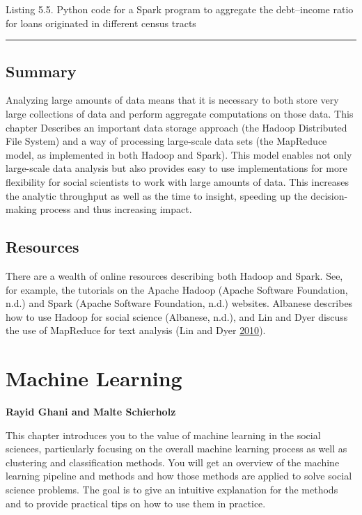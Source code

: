 \documentclass[]{krantz}
\begin{document}
Listing 5.5. Python code for a Spark program to aggregate the
debt--income ratio for loans originated in different census tracts

\begin{center}\rule{0.5\linewidth}{\linethickness}\end{center}

\section{Summary}\label{summary-2}

Analyzing large amounts of data means that it is necessary to both store
very large collections of data and perform aggregate computations on
those data. This chapter Describes an important data storage approach
(the Hadoop Distributed File System) and a way of processing large-scale
data sets (the MapReduce model, as implemented in both Hadoop and
Spark). This model enables not only large-scale data analysis but also
provides easy to use implementations for more flexibility for social
scientists to work with large amounts of data. This increases the
analytic throughput as well as the time to insight, speeding up the
decision-making process and thus increasing impact.

\section{Resources}\label{resources-2}

There are a wealth of online resources describing both Hadoop and Spark.
See, for example, the tutorials on the Apache Hadoop (Apache Software
Foundation, n.d.) and Spark (Apache Software Foundation, n.d.) websites.
Albanese describes how to use Hadoop for social science (Albanese,
n.d.), and Lin and Dyer discuss the use of MapReduce for text analysis
(Lin and Dyer \protect\hyperlink{ref-lin2010data}{2010}).

\hypertarget{chap:ml}{\chapter{Machine Learning}\label{chap:ml}}

\textbf{Rayid Ghani and Malte Schierholz}

This chapter introduces you to the value of machine learning in the
social sciences, particularly focusing on the overall machine learning
process as well as clustering and classification methods. You will get
an overview of the machine learning pipeline and methods and how those
methods are applied to solve social science problems. The goal is to
give an intuitive explanation for the methods and to provide practical
tips on how to use them in practice.
\end{document}
